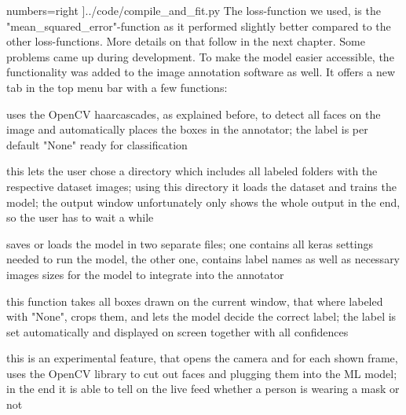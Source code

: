     numbers=right
    ]{../code/compile_and_fit.py}
The loss-function we used, is the "mean\_squared\_error"-function as it performed
slightly better compared to the other loss-functions. More details on that
follow in the next chapter.
\newline
Some problems came up during development. 
\newline
To make the model easier accessible, the functionality was added to the image
annotation software as well. It offers a new tab in the top menu bar with a few
functions:
\begin{description}[font=\sffamily\bfseries, leftmargin=1cm, style=nextline]
    \item[auto detect faces]
        uses the OpenCV haarcascades, as explained before, to detect all faces
        on the image and automatically places the boxes in the annotator; the
        label is per default "None" ready for classification
    \item[train model]
        this lets the user chose a directory which includes all labeled folders
        with the respective dataset images; using this directory it loads the
        dataset and trains the model; the output window unfortunately only shows
        the whole output in the end, so the user has to wait a while
    \item[save/load model]
        saves or loads the model in two separate files; one contains all keras
        settings needed to run the model, the other one, contains label names as
        well as necessary images sizes for the model to integrate into the
        annotator 
    \item[classify current image]
        this function takes all boxes drawn on the current window, that where
        labeled with "None", crops them, and lets the model decide the correct
        label; the label is set automatically and displayed on screen together
        with all confidences
    \item[live classification]
        this is an experimental feature, that opens the camera and for each
        shown frame, uses the OpenCV library to cut out faces and plugging them
        into the ML model; in the end it is able to tell on the live feed
        whether a person is wearing a mask or not
\end{description}
